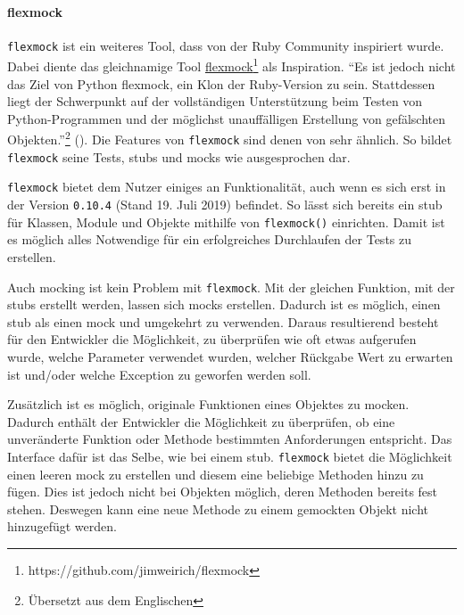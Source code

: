 \paragraph{flexmock}\label{python-tools:flexmock}\mbox{}
\newline
\lstinline{flexmock} ist ein weiteres Tool, dass von der Ruby Community
inspiriert wurde. Dabei diente das gleichnamige Tool
\href{https://github.com/jimweirich/flexmock}{flexmock}\footnote{https://github.com/jimweirich/flexmock}
als Inspiration. "`Es ist jedoch nicht das Ziel von Python flexmock, ein
Klon der Ruby-Version zu sein. Stattdessen liegt der Schwerpunkt auf der
vollständigen Unterstützung beim Testen von Python-Programmen und der möglichst
unauffälligen Erstellung von gefälschten Objekten."'\footnote{Übersetzt aus dem Englischen}
(\cite{flexmock:docs:0.10.3}). Die Features von \lstinline{flexmock} sind denen
von  sehr ähnlich. So bildet \lstinline{flexmock}
seine Tests, \Glspl{stub} und \Glspl{mock} wie ausgesprochen dar.
\newline

\lstinline{flexmock} bietet dem Nutzer einiges an Funktionalität, auch wenn es
sich erst in der Version \lstinline{0.10.4} (Stand 19. Juli 2019) befindet. So
lässt sich bereits ein \Gls{stub} für Klassen, Module und Objekte mithilfe von
\lstinline{flexmock()} einrichten. Damit ist es möglich alles Notwendige für
ein erfolgreiches Durchlaufen der Tests zu erstellen.

Auch \Gls{mock}ing ist kein Problem mit \lstinline{flexmock}. Mit der gleichen
Funktion, mit der \Glspl{stub} erstellt werden, lassen sich
\Glspl{mock} erstellen. Dadurch ist es möglich, einen \Gls{stub} als einen
\Gls{mock} und umgekehrt zu verwenden. Daraus resultierend besteht für den
Entwickler die Möglichkeit, zu überprüfen wie oft etwas aufgerufen wurde, welche
Parameter verwendet wurden, welcher Rückgabe Wert zu erwarten ist und/oder
welche Exception zu geworfen werden soll.

Zusätzlich ist es möglich, originale Funktionen eines Objektes zu
\gls{mock}en. Dadurch enthält der Entwickler die Möglichkeit
zu überprüfen, ob eine unveränderte Funktion oder Methode bestimmten
Anforderungen entspricht. Das Interface dafür ist das Selbe, wie bei einem
\Gls{stub}.
\lstinline{flexmock} bietet die Möglichkeit einen leeren \Gls{mock} zu
erstellen und diesem eine beliebige Methoden hinzu zu fügen. Dies ist jedoch
nicht bei Objekten möglich, deren Methoden bereits fest stehen. Deswegen kann
eine neue Methode zu einem gemockten Objekt nicht hinzugefügt werden.
\newline

